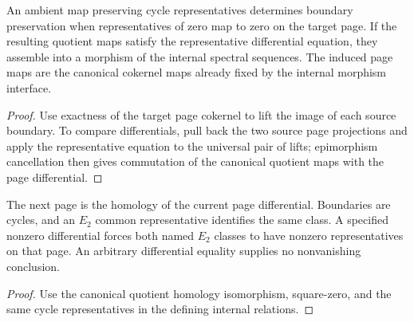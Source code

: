 \begin{proposition}
  \label{prop:internal-representative-morphism-criterion}
  \leanok
  An ambient map preserving cycle representatives determines boundary
  preservation when representatives of zero map to zero on the target page.
  If the resulting quotient maps satisfy the representative differential
  equation, they assemble into a morphism of the internal spectral sequences.
  The induced page maps are the canonical cokernel maps already fixed by the
  internal morphism interface.
\end{proposition}
\begin{proof}
  Use exactness of the target page cokernel to lift the image of each source
  boundary.  To compare differentials, pull back the two source page
  projections and apply the representative equation to the universal pair of
  lifts; epimorphism cancellation then gives commutation of the canonical
  quotient maps with the page differential.
  \leanok
\end{proof}

\begin{proposition}
  \label{prop:internal-page-calculus}
  \leanok
  The next page is the homology of the current page differential. Boundaries
  are cycles, and an $E_2$ common representative identifies the same class.
  A specified nonzero differential forces both named $E_2$ classes to have
  nonzero representatives on that page. An arbitrary differential equality
  supplies no nonvanishing conclusion.
\end{proposition}
\begin{proof}
  Use the canonical quotient homology isomorphism, square-zero, and the same
  cycle representatives in the defining internal relations.
  \leanok
\end{proof}

